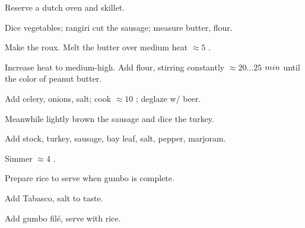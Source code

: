 \begin{preparation}
\item Reserve a dutch oven and skillet.

\item Dice vegetables; rangiri cut the sausage; measure butter, flour.

\item Make the roux.
    Melt the butter over medium heat $\approx 5$ \minute.

\item Increase heat to medium-high.
    Add flour, stirring constantly $\approx 20 \ldots 25$ $\minute$ until the color of peanut butter.

\item Add celery, onions, salt; cook $\approx 10$ \minute; deglaze w/ beer.

\item Meanwhile lightly brown the sausage and dice the turkey.

\item Add stock, turkey, sausage, bay leaf, salt, pepper, marjoram.

\item Simmer $\approx 4$ \hour.

\item Prepare rice to serve when gumbo is complete.

\item Add Tabasco, salt to taste.

\item Add gumbo fil\'{e}, serve with rice.
\end{preparation}

\recipeend%
